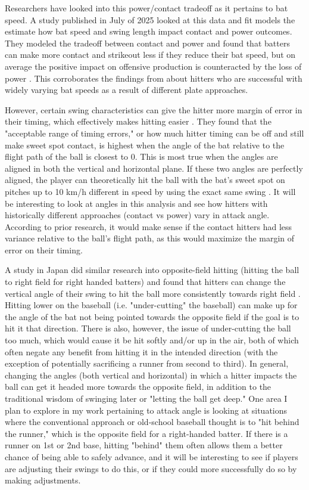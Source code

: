 \documentclass[12pt]{article}
\begin{document}
Researchers have looked into this power/contact tradeoff as it pertains to bat speed. A study published in July of 2025 looked at this data and fit models the estimate how bat speed and swing length impact contact and power outcomes. They modeled the tradeoff between contact and power and found that batters can make more contact and strikeout less if they reduce their bat speed, but on average the positive impact on offensive production is counteracted by the loss of power \parencite{powers_yurko_2025_swinging}. This corroborates the findings from \cite{clemens2024statcastbat} about hitters who are successful with widely varying bat speeds as a result of different plate approaches. 

However, certain swing characteristics can give the hitter more margin of error in their timing, which effectively makes hitting easier \parencite{nakashima2025timingerror}. They found that the "acceptable range of timing errors," or how much hitter timing can be off and still make sweet spot contact, is highest when the angle of the bat relative to the flight path of the ball is closest to 0\textdegree. This is most true when the angles are aligned in both the vertical and horizontal plane. If these two angles are perfectly aligned, the player can theoretically hit the ball with the bat's sweet spot on pitches up to 10 km/h different in speed by using the exact same swing \parencite{nakashima2025timingerror}. It will be interesting to look at angles in this analysis and see how hitters with historically different approaches (contact vs power) vary in attack angle. According to prior research, it would make sense if the contact hitters had less variance relative to the ball's flight path, as this would maximize the margin of error on their timing.

A study in Japan did similar research into opposite-field hitting (hitting the ball to right field for right handed batters) and found that hitters can change the vertical angle of their swing to hit the ball more consistently towards right field \parencite{shimura2018optimal}. Hitting lower on the baseball (i.e. "under-cutting" the baseball) can make up for the angle of the bat not being pointed towards the opposite field if the goal is to hit it that direction. There is also, however, the issue of under-cutting the ball too much, which would cause it be hit softly and/or up in the air, both of which often negate any benefit from hitting it in the intended direction (with the exception of potentially sacrificing a runner from second to third). In general, changing the angles (both vertical and horizontal) in which a hitter impacts the ball can get it headed more towards the opposite field, in addition to the traditional wisdom of swinging later or "letting the ball get deep." One area I plan to explore in my work pertaining to attack angle is looking at situations where the conventional approach or old-school baseball thought is to "hit behind the runner," which is the opposite field for a right-handed batter. If there is a runner on 1st or 2nd base, hitting "behind" them often allows them a better chance of being able to safely advance, and it will be interesting to see if players are adjusting their swings to do this, or if they could more successfully do so by making adjustments. 
\end{document}

